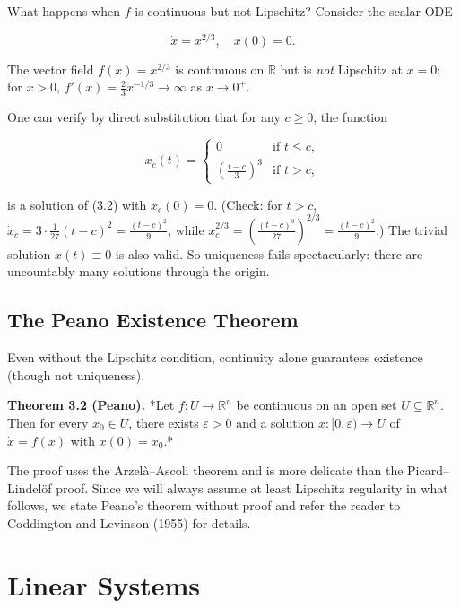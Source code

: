 What happens when $f$ is continuous but not Lipschitz? Consider the scalar ODE

\begin{equation}\label{eq:3.2}\tag{3.2}
\dot{x} = x^{2/3}, \quad x(0) = 0.
\end{equation}

The vector field $f(x) = x^{2/3}$ is continuous on $\mathbb{R}$ but is \textit{not} Lipschitz at $x = 0$: for $x > 0$, $f'(x) = \frac{2}{3}x^{-1/3} \to \infty$ as $x \to 0^+$.

One can verify by direct substitution that for any $c \geq 0$, the function

\[
x_c(t) = \begin{cases} 0 & \text{if } t \leq c, \\ \left(\frac{t - c}{3}\right)^3 & \text{if } t > c, \end{cases}
\]

is a solution of (3.2) with $x_c(0) = 0$. (Check: for $t > c$, $\dot{x}_c = 3 \cdot \frac{1}{27}(t-c)^2 = \frac{(t-c)^2}{9}$, while $x_c^{2/3} = \left(\frac{(t-c)^3}{27}\right)^{2/3} = \frac{(t-c)^2}{9}$.) The trivial solution $x(t) \equiv 0$ is also valid. So uniqueness fails spectacularly: there are uncountably many solutions through the origin.

\subsection{The Peano Existence Theorem}\label{sec:3.2.3}

Even without the Lipschitz condition, continuity alone guarantees existence (though not uniqueness).

\textbf{Theorem 3.2 (Peano).} *Let $f: U \to \mathbb{R}^n$ be continuous on an open set $U \subseteq \mathbb{R}^n$. Then for every $x_0 \in U$, there exists $\varepsilon > 0$ and a solution $x: [0, \varepsilon) \to U$ of $\dot{x} = f(x)$ with $x(0) = x_0$.*

The proof uses the Arzel\`a--Ascoli theorem and is more delicate than the Picard--Lindel\"of proof. Since we will always assume at least Lipschitz regularity in what follows, we state Peano's theorem without proof and refer the reader to Coddington and Levinson (1955) for details.


\bigskip


\section{Linear Systems}\label{sec:3.3}

